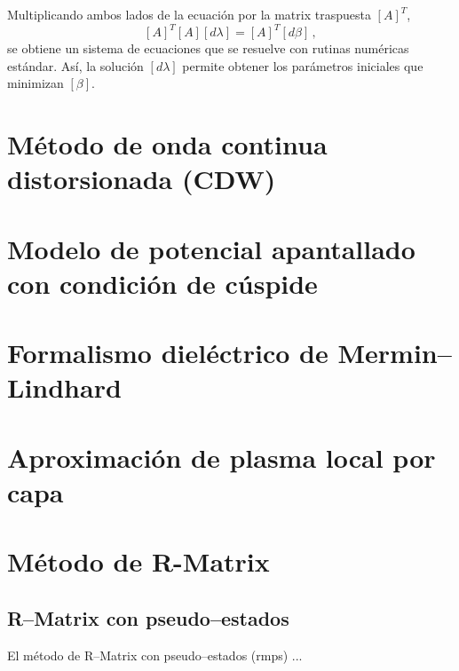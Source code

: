 Multiplicando ambos lados de la ecuación por la matrix traspuesta $[A]^{T}$,
\begin{equation}
  \left[ A \right]^T \left[ A \right]\left[ d\lambda \right] =
  \left[ A \right]^T \left[ d\beta \right]\,,
\end{equation}
se obtiene un sistema de ecuaciones que se resuelve con rutinas numéricas 
estándar. Así, la solución $[d\lambda]$ permite obtener los parámetros 
iniciales que minimizan $[\beta]$.

\chapter{Método de onda continua distorsionada (CDW)}
\label{app:CDW}

\chapter{Modelo de potencial apantallado con condición de cúspide}
\label{app:SPCC}

\chapter{Formalismo dieléctrico de Mermin--Lindhard}
\label{app:ML}

\chapter{Aproximación de plasma local por capa}
\label{app:SLPA}

\chapter{Método de R-Matrix}
\label{app:rmatrix}

\section{R--Matrix con pseudo--estados}
\label{app:RMPS}

El método de R--Matrix con pseudo--estados (\acs{rmps}) ...


